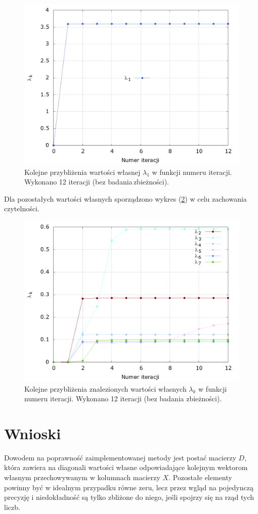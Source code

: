 \begin{figure}[h!]
	\begin{center}
		\includegraphics[height=0.43\linewidth]{lambda1.png}
		\caption{Kolejne przybliżenia wartości własnej $ \lambda_1 $ w funkcji numeru iteracji. Wykonano 12 iteracji (bez badania\,zbieżności).}
		\label{lambda1}
	\end{center}
\end{figure}
Dla pozostałych wartości własnych sporządzono wykres (\ref{lambdas}) w celu zachowania czytelności.
\begin{figure}[h!]
	\begin{center}
		\includegraphics[height=0.43\linewidth]{lambdas.png}
		\caption{Kolejne przybliżenia znalezionych wartości własnych $ \lambda_k $ w funkcji numeru iteracji. Wykonano 12 iteracji (bez badania zbieżności).}
		\label{lambdas}
	\end{center}
\end{figure}

\newpage
\section{Wnioski}
Dowodem na poprawność zaimplementowanej metody jest postać macierzy $D$, która zawiera na diagonali wartości własne odpowiadające kolejnym wektorom własnym przechowywanym w kolumnach macierzy $X$. Pozostałe elementy powinny być w idealnym przypadku równe zeru, lecz przez wgląd na pojedynczą precyzję i niedokładność są tylko zbliżone do niego, jeśli spojrzy się na rząd tych liczb.


